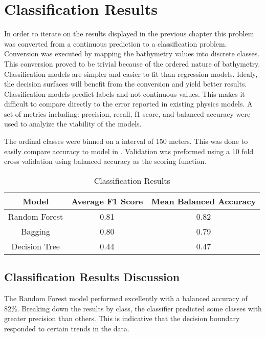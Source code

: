 \section{Classification Results}
\setlength{\parindent}{10ex}
In order to iterate on the results displayed in the previous chapter this problem was converted from a continuous prediction to a classification problem.
Conversion was executed by mapping the bathymetry values into discrete classes.
This conversion proved to be trivial because of the ordered nature of bathymetry.
Classification models are simpler and easier to fit than regression models.
Idealy, the decision surfaces will benefit from the conversion and yield better results.
Classification models predict labels and not continuous values.
This makes it difficult to compare directly to the error reported in existing physics models.
A set of metrics including: precision, recall, f1 score, and balanced accuracy were used to analyize the viability of the models.

\par
The ordinal classes were binned on a interval of 150 meters.
This was done to easily compare accuracy to model in \cite{jena2012prediction}.
Validation was preformed using a 10 fold cross validation using balanced accuracy as the scoring function.

\begin{table}[htb]
    \centering
    \begin{tabular}{|c c c|}
        \hline
		\textbf{Model} & \textbf{Average F1 Score} & \textbf{Mean Balanced Accuracy} \\
		\hline
		Random Forest & 0.81 & 0.82 \\
        Bagging & 0.80 & 0.79 \\
        Decision Tree & 0.44 & 0.47 \\
        \hline
    \end{tabular}
    \label{table:CLASSIFICATION_RESULTS}
    \caption{Classification Results}
\end{table}

\subsection{Classification Results Discussion}
The Random Forest model performed excellently with a balanced accuracy of 82\%.
Breaking down the results by class, the classifier predicted some classes with greater precision than others.
This is indicative that the decision boundary responded to certain trends in the data.

